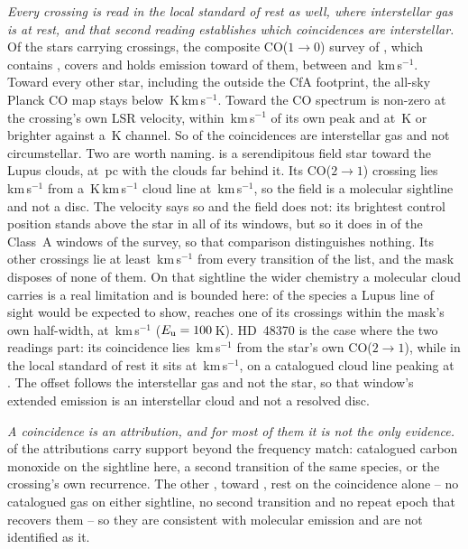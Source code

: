 \emph{Every crossing is read in the local standard of rest as well, where
interstellar gas is at rest, and that second reading
establishes which coincidences are interstellar.} Of the \LsNLos{} stars carrying crossings, the composite
CO($1\to0$) survey of \citet{DameThaddeus2022}, which contains
\citet{Dame2001}, covers \LsNLosCov{} and holds emission toward \LsNLosDet{}
of them, between \LsCoVLo{} and \LsCoVHi\,km\,s$^{-1}$. Toward every other
star, including the \LsNLosOut{} outside the CfA footprint, the all-sky
Planck CO map \citep{PlanckCO2016} stays below
\LsPlanckMax\,K\,km\,s$^{-1}$. Toward
\LsCloudStars{} the CO spectrum is non-zero at the crossing's own LSR
velocity, within \LsCloudDvMax\,km\,s$^{-1}$ of its own peak and at
\LsCloudTMin\,K or brighter against a \LsCoRms\,K channel. So \LsNCloud{} of
the \MkNCoinc{} coincidences are interstellar gas and not circumstellar.
Two are worth naming. \BkAlmaName{} is a serendipitous field star toward the
Lupus clouds, at \BkAlmaDistPc\,pc with the clouds far behind it. Its
CO($2\to1$) crossing lies \LsLupDv\,km\,s$^{-1}$ from a
\LsLupWco\,K\,km\,s$^{-1}$ cloud line at \LsLupVco\,km\,s$^{-1}$, so the
field is a molecular sightline and not a disc. The velocity says so and the
field
does not: its brightest control position stands above the star in all
\LsLupNRingLeadWord{} of its windows, but so it does in \LsRingLeadA{} of the
\NWinA{} Class~A windows of the survey, so that comparison
distinguishes nothing. Its other
\LsLupNFar{} crossings lie at least \LsLupFarMin\,km\,s$^{-1}$ from every
transition of the list, and the mask disposes of none of them. On that
sightline the wider chemistry a molecular cloud carries is a real limitation
and is bounded here: of the species a Lupus line of sight would be expected
to show, \XlLupNamedN{} reaches one of its crossings within the mask's own
half-width, \XlLupNamedMol{} at \XlLupNamedDv\,km\,s$^{-1}$
($E_{\rm u}=100$\,K). HD~48370 is
the case where the two readings part: its coincidence lies
\LsHdDvStar\,km\,s$^{-1}$ from the star's own CO($2\to1$), while in the local
standard of rest it sits at \LsHdVfeat\,km\,s$^{-1}$, on a catalogued cloud
line peaking at \LsHdVco. The offset follows the interstellar gas and not the
star, so that window's extended emission is an interstellar cloud and not
a resolved disc.

\emph{A coincidence is an attribution, and for most of them it is not the
only evidence.} \LnAttrSupp{} of the \MkAttr{} attributions carry support
beyond the frequency match: catalogued carbon monoxide on the sightline here,
a second transition of the same species, or the crossing's own recurrence.
The other \LnAttrCoincWord, toward \LnCoincStars, rest on the coincidence
alone -- no catalogued gas on either sightline, no second transition and no
repeat epoch that recovers them -- so they are consistent with molecular
emission and are not identified as it.

